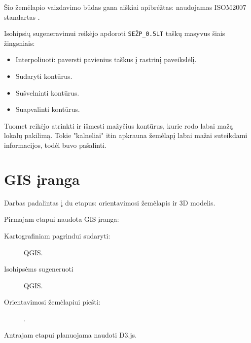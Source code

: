 \documentclass{article}
\begin{document}
Šio žemėlapio vaizdavimo būdas gana aiškiai apibrėžtas: naudojamas ISOM2007
standartas \cite{isom2007}.

Isohipsių sugeneravimui reikėjo apdoroti \texttt{SEŽP\_0.5LT} taškų masyvus šiais žingsniais:
\begin{itemize}
    \item Interpoliuoti: paversti pavienius taškus į rastrinį paveikslėlį.
    \item Sudaryti kontūrus.
    \item Sušvelninti kontūrus.
    \item Suapvalinti kontūrus.
\end{itemize}

Tuomet reikėjo atrinkti ir išmesti mažyčius kontūrus, kurie rodo labai mažą
lokalų pakilimą. Tokie "kalneliai" itin apkrauna žemėlapį labai mažai
suteikdami informacijos, todėl buvo pašalinti.

\section{GIS įranga}

Darbas padalintas į du etapus: orientavimosi žemėlapis ir 3D modelis.

Pirmajam etapui naudota GIS įranga:

\begin{description}
    \item[Kartografiniam pagrindui sudaryti:] QGIS.
    \item[Isohipsėms sugeneruoti] QGIS.
    \item[Orientavimosi žemėlapiui piešti:] \cite{mapper}.
\end{description}

Antrajam etapui planuojama naudoti D3.js.

\printbibliography
\end{document}
